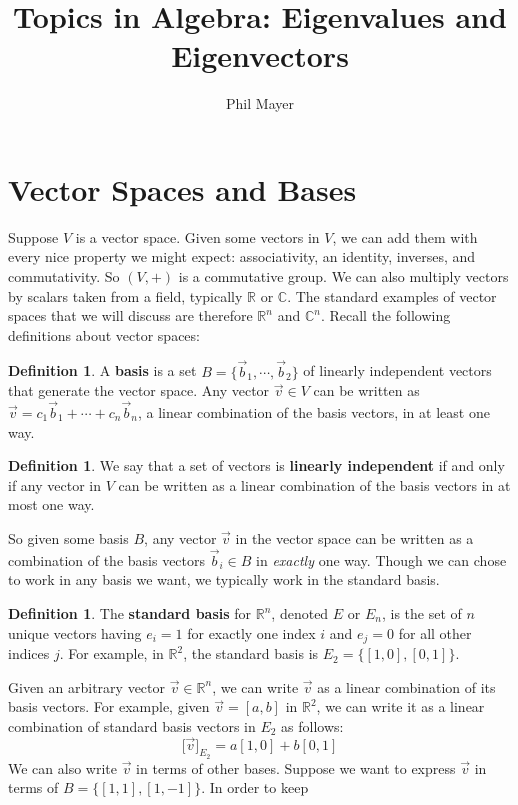 \documentclass[11pt]{amsart}
\title{Topics in Algebra: Eigenvalues and Eigenvectors}
\author{Phil Mayer}
\theoremstyle{definition}
\newtheorem{definition}[theorem]{Definition}
\newcommand{\complexNumbers}{\mathbb{C}}
\newcommand{\reals}{\mathbb{R}}
\begin{document}
\maketitle

\section{Vector Spaces and Bases}
Suppose $V$ is a vector space. Given some vectors in $V$, we can add them with every nice property we might expect: associativity, an
identity, inverses, and commutativity. So $(V, +)$ is a commutative group. We can also multiply vectors by scalars taken from a field, typically 
$\reals$ or $\complexNumbers$. The standard examples of vector spaces that we will discuss are therefore $\reals^n$ and 
$\complexNumbers^n$. Recall the following definitions about vector spaces:
\begin{definition}
	A \textbf{basis} is a set $B = \{ \vec{b}_1, \cdots, \vec{b}_2 \}$ of linearly independent vectors that generate the vector space. 
	Any vector $\vec{v} \in V$ can be written as $\vec{v} = c_1 \vec{b}_1 + \cdots + c_n \vec{b}_n$, a linear combination of the basis vectors,
	in at least one way.
\end{definition}
\begin{definition}
	We say that a set of vectors is \textbf{linearly independent} if and only if any vector in $V$ can be written as a linear combination of the
	basis vectors in at most one way.
\end{definition}
So given some basis $B$, any vector $\vec{v}$ in the vector space can be written as a combination of the basis vectors $\vec{b}_i \in B$ in
\textit{exactly} one way. Though we can chose to work in any basis we want, we typically work in the standard basis.
\begin{definition}
	The \textbf{standard basis} for $\reals^n$, denoted $E$ or $E_n$, is the set of $n$ unique vectors having $e_i = 1$ for exactly one index
	$i$ and $e_j = 0$ for all other indices $j$. For example, in $\reals^2$, the standard basis is $E_2 = \{ [1, 0], [0, 1] \}$.
\end{definition}
Given an arbitrary vector $\vec{v} \in \reals^n$, we can write $\vec{v}$ as a linear combination of its basis vectors. For example, given $\vec{v} =
[a, b]$ in $\reals^2$, we can write it as a linear combination of standard basis vectors in $E_2$ as follows:
\[
	\big[ \vec{v} \big]_{E_2} = a [1, 0] + b [0, 1]
\]
We can also write $\vec{v}$ in terms of other bases. Suppose we want to express $\vec{v}$ in terms of $B = \{ [1, 1], [1, -1] \}$. In order to keep
\end{document}
